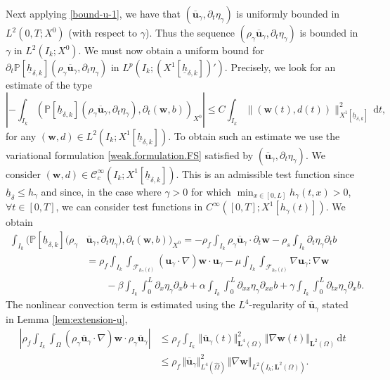 \documentclass[10pt]{amsart}
\let\mathcal\mathscr
\theoremstyle{remark}
\theoremstyle{definition}
\newcommand{\norme}[1]{\,\Vert #1\Vert}
\newcommand{\ug}{\boldsymbol{u}}
\newcommand{\dd}{\,\mathrm{d}}
\newcommand{\wg}{\boldsymbol{w}}
\newcommand{\BS}[1]{\boldsymbol{#1}}
\let\CM\Omega
\newcommand{\CMT}{\widehat{\Omega}}
\newcommand{\hb}{{\underline{h}}}
\begin{document}
Next applying \eqref{bound-u-1}, we have that $(\overline{\ug}_{\gamma},\partial_{t}\eta_{\gamma})$ is uniformly bounded in $L^{2}(0,T;X^0)$ (with respect to $\gamma$). Thus the sequence $(\rho_{\gamma}\overline{\ug}_{\gamma},\partial_{t}\eta_{\gamma})$ is bounded in $\gamma$ in $L^{2}(I_{k};X^0)$. We must now obtain a uniform bound for
$\partial_{t}\mathbb{P}[\hb_{\delta, k}](\rho_{\gamma}\overline{\ug}_{\gamma},\partial_{t}\eta_{\gamma})$ in $L^p(I_k; (X^1[\hb_{\delta,k}])')$. Precisely, we look for an estimate of the type
\[
\left| -\int_{I_{k}}\left( \mathbb{P}[\hb_{\delta, k}](\rho_{\gamma}\overline{\ug}_{\gamma},\partial_{t}\eta_{\gamma}), \partial_{t}(\wg,b) \right)_{X^0}
\right| \leq C \int_{I_k} \|(\wg(t),d(t))\|_{X^1[\hb_{\delta,k}]}^{2}
\dd t,
\]
for any $(\wg,d) \in L^2(I_k; X^1[\hb_{\delta,k}])$.
To obtain such an estimate we use the variational formulation \eqref{weak.formulation.FS} satisfied by $(\overline{\ug}_{\gamma},\partial_{t}\eta_{\gamma})$. We consider
$(\wg,d) \in \mathcal C^{\infty}_c(I_k; X^1[\hb_{\delta,k}])$. This is an admissible test function since $\hb_{\delta}\leq h_\gamma$ and since, in the case where \hbox{$\gamma>0$} for which $\min_{x\in [0, L]}h_\gamma(t, x)>0$, $\forall t\in [0, T]$, we can consider test functions in $C^{\infty}([0, T]; X^1[h_\gamma(t)])$.
We obtain
\begin{align*}
\int_{I_{k}}\bigl( \mathbb{P}[\hb_{\delta, k}](\rho_{\gamma}&\overline{\ug}_{\gamma},\partial_{t}\eta_{\gamma}), \partial_{t}(\wg,b) \bigr)_{X^0}=-\rho_{f}\int_{I_{k}}\rho_{\gamma}\overline{\ug}_{\gamma}\cdot\partial_{t}\wg - \rho_{s}\int_{I_{k}}\partial_{t}\eta_{\gamma}\partial_{t}b\\
&=\rho_{f}\int_{I_{k}}\int_{\mathcal{F}_{h_\gamma(t)}}({\ug}_{\gamma}\cdot\nabla)\wg\cdot{\ug}_{\gamma}-\mu\int_{I_{k}}\int_{\mathcal{F}_{h_\gamma(t)}}\nabla{\ug_\gamma}:\nabla \wg\\
& \qquad -\beta\int_{I_{k}}\int_{0}^{L}\partial_{x}\eta_{\gamma}\partial_{x}b+ \alpha\int_{I_{k}}\int_{0}^{L}\partial_{xx}\eta_{\gamma}\partial_{xx}b +\gamma\int_{I_{k}}\int_{0}^{L}\partial_{tx}\eta_{\gamma}\partial_{x}b.
\end{align*}
The nonlinear convection term is estimated using the $L^{4}$-regularity of $\overline{\ug}_{\gamma}$ stated in Lemma \ref{lem:extension-u},
\[\begin{aligned}
\left\vert\rho_{f} \int_{I_{k}}\int_{\CM}(\rho_{\gamma}\overline{\ug}_{\gamma}\cdot\nabla)\wg\cdot\rho_{\gamma}\overline{\ug}_{\gamma}\right\vert&{}\leq \rho_{f}\int_{I_{k}}\norme{\overline{\ug}_{\gamma}(t)}_{\BS{L}^{4}(\CM)}^{2}\norme{\nabla\wg(t)}_{\BS{L}^{2}(\CM)}\dd t\\
&\leq \rho_{f}\norme{\overline{\ug}_{\gamma}}_{L^{4}(\CMT)}^{2}\norme{\nabla\wg}_{L^{2}(I_{k};\BS{L}^{2}(\CM))}.
\end{aligned}
\]
\end{document}
